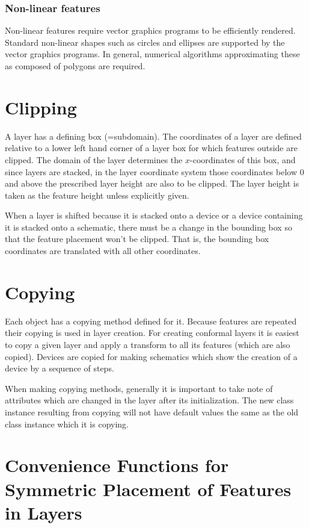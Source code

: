 \documentclass{article}
\begin{document}
\subsubsection{Non-linear features}
Non-linear features require vector graphics programs to be efficiently rendered. Standard non-linear shapes such as circles and ellipses are supported by the vector graphics programs. In general, numerical algorithms approximating these as composed of polygons are required.

\section{Clipping}
A layer has a defining box (=subdomain). The coordinates of a layer are defined relative to a lower left hand corner of a layer box for which features outside are clipped. The domain of the layer determines the $x$-coordinates of this box, and since layers are stacked, in the layer coordinate system those coordinates below 0 and above the prescribed layer height are also to be clipped. The layer height is taken as the feature height unless explicitly given.

When a layer is shifted because it is stacked onto a device or a device containing it is stacked onto a schematic, there must be a change in the bounding box so that the feature placement won't be clipped. That is, the bounding box coordinates are translated with all other coordinates.

\section{Copying} 
Each object has a copying method defined for it. Because features are repeated their copying is used in layer creation. For creating conformal layers it is easiest to copy a given layer and apply a transform to all its features (which are also copied). Devices are copied for making schematics which show the creation of a device by a sequence of steps.

When making copying methods, generally it is important to take note of attributes which are changed in the layer after its initialization. The new class instance resulting from copying will not have default values the same as the old class instance which it is copying.

\section{Convenience Functions for Symmetric Placement of Features in Layers}
\end{document}
